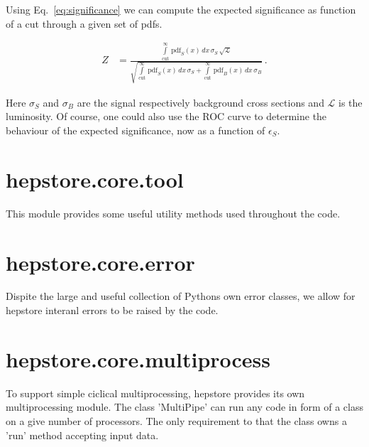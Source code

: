 Using Eq.~\ref{eq:significance} we can compute the expected
significance as function of a cut through a given set of pdfs.
%
\begin{ceqn}
  \begin{align}
     Z &= \frac{
     \int \limits_\text{cut}^\infty \, \text{pdf}_S(x) \,dx
     \, \sigma_S \, \sqrt{\mathcal{L}}
     }{
     \sqrt{
     \int \limits_\text{cut}^\infty \, \text{pdf}_S(x) \,dx
     \, \sigma_S
     + 
     \int \limits_\text{cut}^\infty \, \text{pdf}_B(x) \,dx
     \, \sigma_B
     }}\,.  
     \label{eq:significance}
  \end{align}
\end{ceqn}
%
Here $\sigma_S$ and $\sigma_B$ are the signal respectively background
cross sections and $\mathcal{L}$ is the luminosity. Of course, one
could also use the ROC curve to determine the behaviour of the
expected significance, now as a function of $\epsilon_S$.

\section{hepstore.core.tool}

This module provides some useful utility methods used throughout the
code.
%
\hspace*{0.5cm}
\hspace*{0.5cm}
%

\section{hepstore.core.error}

Dispite the large and useful collection of Pythons own error classes,
we allow for hepstore interanl errors to be raised by the code.
%
\hspace*{0.5cm}
\hspace*{0.5cm}
%

\section{hepstore.core.multiprocess}

To support simple ciclical multiprocessing, hepstore provides its own
multiprocessing module. The class 'MultiPipe' can run any code in form
of a class on a give number of processors. The only requirement to
that the class owns a 'run' method accepting input data.
